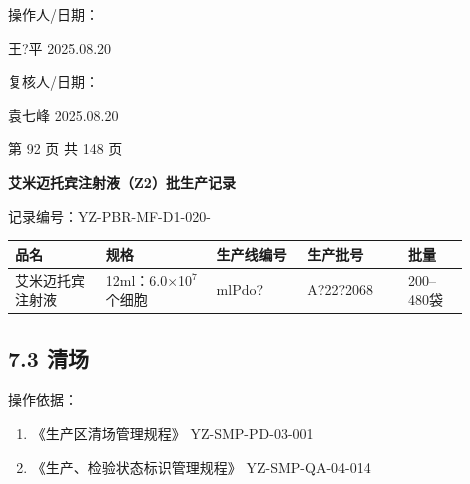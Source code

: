 \documentclass[UTF8,10pt,a4paper,fontset=fandol]{ctexart}
\newcommand{\fieldvalue}[1]{#1}
\newcommand{\handwritten}[1]{#1}
\begin{document}
\vspace{0.8em}

\noindent
操作人/日期：

\fieldvalue{\handwritten{王?平}}
\qquad
\fieldvalue{\handwritten{2025.08.20}}

\hfill
复核人/日期：

\fieldvalue{\handwritten{袁七峰}}
\qquad
\fieldvalue{\handwritten{2025.08.20}}

\vfill

\begin{center}
第 92 页 共 148 页
\end{center}

\newpage

\begin{center}
\textbf{艾米迈托宾注射液（Z2）批生产记录}
\end{center}

\noindent
记录编号：YZ-PBR-MF-D1-020-\hspace{1cm}

\begin{tabular}{|p{0.18\linewidth}|p{0.22\linewidth}|p{0.18\linewidth}|p{0.20\linewidth}|p{0.12\linewidth}|}
\hline
品名 & 规格 & 生产线编号 & 生产批号 & 批量\\
\hline
艾米迈托宾注射液 &
12ml：6.0$\times$10$^{7}$个细胞 &
\fieldvalue{\handwritten{mlPdo?}} &
\fieldvalue{\handwritten{A?22?2068}} &
200--480袋\\
\hline
\end{tabular}

\subsection*{7.3 清场}

\noindent
操作依据：

\begin{enumerate}
\item 《生产区清场管理规程》 \hfill YZ-SMP-PD-03-001
\item 《生产、检验状态标识管理规程》 \hfill YZ-SMP-QA-04-014
\end{enumerate}
\end{document}
